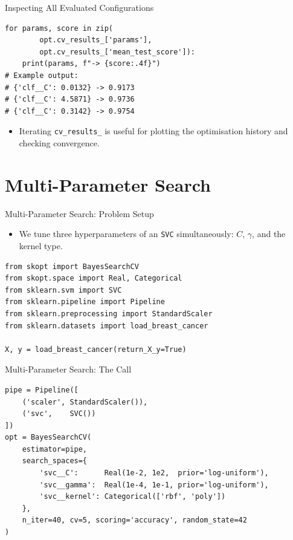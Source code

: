 \documentclass{beamer}
\begin{document}
\begin{frame}[fragile]{Inspecting All Evaluated Configurations}
  \begin{lstlisting}
for params, score in zip(
        opt.cv_results_['params'],
        opt.cv_results_['mean_test_score']):
    print(params, f"-> {score:.4f}")
# Example output:
# {'clf__C': 0.0132} -> 0.9173
# {'clf__C': 4.5871} -> 0.9736
# {'clf__C': 0.3142} -> 0.9754
  \end{lstlisting}
  \begin{itemize}
    \item Iterating \texttt{cv\_results\_} is useful for plotting the optimisation history and checking convergence.
  \end{itemize}
\end{frame}

\section{Multi-Parameter Search}

\begin{frame}[fragile]{Multi-Parameter Search: Problem Setup}
  \begin{itemize}
    \item We tune three hyperparameters of an \texttt{SVC} simultaneously: \(C\), \(\gamma\), and the kernel type.
  \end{itemize}
  \begin{lstlisting}
from skopt import BayesSearchCV
from skopt.space import Real, Categorical
from sklearn.svm import SVC
from sklearn.pipeline import Pipeline
from sklearn.preprocessing import StandardScaler
from sklearn.datasets import load_breast_cancer

X, y = load_breast_cancer(return_X_y=True)
  \end{lstlisting}
\end{frame}

\begin{frame}[fragile]{Multi-Parameter Search: The Call}
  \begin{lstlisting}
pipe = Pipeline([
    ('scaler', StandardScaler()),
    ('svc',    SVC())
])
opt = BayesSearchCV(
    estimator=pipe,
    search_spaces={
        'svc__C':      Real(1e-2, 1e2,  prior='log-uniform'),
        'svc__gamma':  Real(1e-4, 1e-1, prior='log-uniform'),
        'svc__kernel': Categorical(['rbf', 'poly'])
    },
    n_iter=40, cv=5, scoring='accuracy', random_state=42
)
  \end{lstlisting}
\end{frame}
\end{document}
